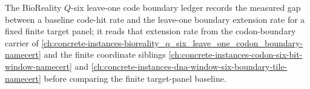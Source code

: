 The BioReality $Q$-six leave-one code boundary ledger records the measured gap between a baseline code-hit rate and the leave-one boundary extension rate for a fixed finite target panel; it reads that extension rate from the codon-boundary carrier of \autoref{ch:concrete-instances-bioreality_q_six_leave_one_codon_boundary-namecert} and the finite coordinate siblings \autoref{ch:concrete-instances-codon-six-bit-window-namecert} and \autoref{ch:concrete-instances-dna-window-six-boundary-tile-namecert} before comparing the finite target-panel baseline.

